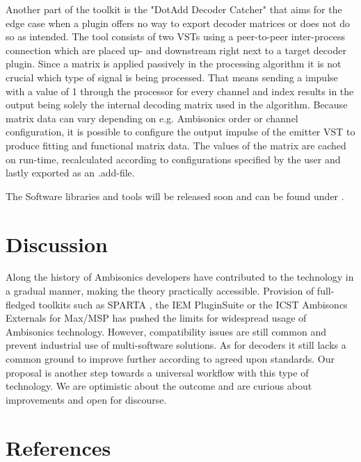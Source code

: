 \documentclass[a4paper, 10pt, twocolumn]{article}
\begin{document}
Another part of the toolkit is the "DotAdd Decoder Catcher" that aims for the edge case when a plugin offers no way to export decoder matrices or does not do so as intended. The tool consists of two VSTs using a peer-to-peer inter-process connection which are placed up- and downstream right next to a target decoder plugin. Since a matrix is applied passively in the processing algorithm it is not crucial which type of signal is being processed. That means sending a impulse with a value of 1 through the processor for every channel and index results in the output being solely the internal decoding matrix used in the algorithm. Because matrix data can vary depending on e.g. Ambisonics order or channel configuration, it is possible to configure the output impulse of the emitter VST to produce fitting and functional matrix data. The values of the matrix are cached on run-time, recalculated according to configurations specified by the user and lastly exported as an .add-file.


The Software libraries and tools will be released soon and can be found under \cite{dotadd}.


\section{Discussion}\label{sec:Discussion}

Along the history of Ambisonics developers have contributed to the technology in a gradual manner, making the theory practically accessible. Provision of full-fledged toolkits such as SPARTA \cite{SPARTAOnline}, the IEM PluginSuite \cite{IEMPluginsOnline} or the ICST Ambisoncs Externals for Max/MSP \cite{ICSTAmbiOnline} has pushed the limits for widespread usage of Ambisonics technology. However, compatibility issues are still common and prevent industrial use of multi-software solutions. 
As for decoders it still lacks a common ground to improve further according to agreed upon standards. Our proposal is another step towards a universal workflow with this type of technology. We are optimistic about the outcome and are curious about improvements and open for discourse.



\renewcommand\refname{}
\section{References}\label{sec:References}

\begingroup
\RaggedRight 		%

\printbibliography
\endgroup
\end{document}
